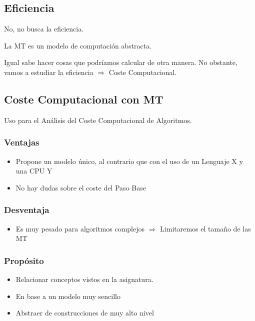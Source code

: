 \subsection{Eficiencia}
No, no busca la eficiencia.

La MT es un modelo de computación abstracta.

Igual sabe hacer cosas que podríamos calcular de otra manera. No obstante, vamos a estudiar la eficiencia $\Rightarrow$ Coste Computacional.
\pagebreak

\subsection{Coste Computacional con MT}
Uso para el Análisis del Coste Computacional de Algoritmos.

\subsubsection{Ventajas}
\begin{itemize}
    \item Propone un modelo único, al contrario que con el uso de un Lenguaje X y una CPU Y
    \item No hay dudas sobre el coste del Paso Base
\end{itemize}

\subsubsection{Desventaja}
\begin{itemize}
    \item Es muy pesado para algoritmos complejos $\Rightarrow$ Limitaremos el tamaño de las MT
\end{itemize}

\subsubsection{Propósito}
\begin{itemize}
    \item Relacionar conceptos vistos en la asignatura.
    \item En base a un modelo muy sencillo
    \item Abstraer de construcciones de muy alto nivel
\end{itemize}

